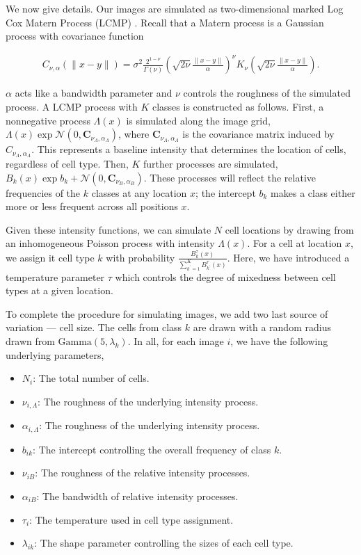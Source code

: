 We now give details. Our images are simulated as two-dimensional marked Log Cox Matern Process (LCMP) \cite{diggle2013}. Recall that a Matern process is a Gaussian process with covariance function

\begin{align*}
C_{\nu, \alpha}(\|x - y\|)=\sigma^{2} \frac{2^{1-\nu}}{\Gamma(\nu)}\left(\sqrt{2 \nu} \frac{\|x - y\|}{\alpha}\right)^{\nu} K_{\nu}\left(\sqrt{2 \nu} \frac{\|x - y\|}{\alpha}\right).
\end{align*}

$\alpha$ acts like a bandwidth parameter and $\nu$ controls the roughness of the simulated process. A LCMP process with $K$ classes is constructed as follows. First, a nonnegative process $\Lambda\left(x\right)$ is simulated along the image grid, $\Lambda\left(x\right)  \exp{\mathcal{N}\left(0, \mathbf{C}_{\nu_{\Lambda}, \alpha_{\Lambda}}\right)}$, where $\mathbf{C}_{\nu_{\Lambda}, \alpha_{\Lambda}}$ is the covariance matrix induced by $C_{\nu_{\Lambda}, \alpha_{\Lambda}}$. This represents a baseline intensity that determines the location of cells, regardless of cell type. Then, $K$ further processes are simulated, $B_{k}\left(x\right)  \exp{b_{k} + \mathcal{N}\left(0, \mathbf{C}_{\nu_{B}, \alpha_{B}}\right)} $. These processes will reflect the relative frequencies of the $k$ classes at any location $x$; the intercept $b_k$ makes a class either more or less frequent across all positions $x$.

Given these intensity functions, we can simulate $N$ cell locations by drawing from an inhomogeneous Poisson process with intensity $\Lambda\left(x\right)$. For a cell at location $x$, we assign it cell type $k$ with probability $\frac{B_{k}^{\tau}\left(x\right)}{\sum_{k^\prime = 1}^{K} B^{\tau}_{k^\prime}\left(x\right)}$. Here, we have introduced a temperature parameter $\tau$ which controls the degree of mixedness between cell types at a given location.

To complete the procedure for simulating images, we add two last source of
variation — cell size. The cells from class $k$ are drawn with a random radius
drawn from $\text{Gamma}\left(5, \lambda_{k}\right)$. In all, for each image
$i$, we have the following underlying parameters,

\begin{itemize}
\item $N_i$: The total number of cells.
\item $\nu_{i,\Lambda}$: The roughness of the underlying intensity process.
\item $\alpha_{i,\Lambda}$: The roughness of the underlying intensity process.
\item $b_{ik}$: The intercept controlling the overall frequency of class $k$.
\item $\nu_{iB}$: The roughness of the relative intensity processes.
\item $\alpha_{iB}$: The bandwidth of relative intensity processes.
\item $\tau_{i}$: The temperature used in cell type assignment.
\item $\lambda_{ik}$: The shape parameter controlling the sizes of each cell type.
\end{itemize}

